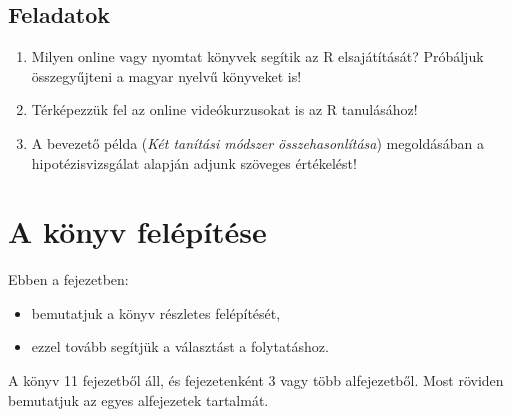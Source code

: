 \documentclass[
]{book}
\makeatletter
\providecommand{\tightlist}{%
  \setlength{\itemsep}{0pt}\setlength{\parskip}{0pt}}
\newenvironment{kframe}{%
\medskip{}
\setlength{\fboxsep}{.8em}
 \def\at@end@of@kframe{}%
 \ifinner\ifhmode%
  \def\at@end@of@kframe{\end{minipage}}%
  \begin{minipage}{\columnwidth}%
 \fi\fi%
 \def\FrameCommand##1{\hskip\@totalleftmargin \hskip-\fboxsep
 \colorbox{shadecolor}{##1}\hskip-\fboxsep
     \hskip-\linewidth \hskip-\@totalleftmargin \hskip\columnwidth}%
 \MakeFramed {\advance\hsize-\width
   \@totalleftmargin\z@ \linewidth\hsize
   \@setminipage}}%
 {\par\unskip\endMakeFramed%
 \at@end@of@kframe}
\newenvironment{rmdblock}[1]
  {
  \begin{itemize}
  \renewcommand{\labelitemi}{
    \raisebox{-.7\height}[0pt][0pt]{
      {\setkeys{Gin}{width=3em,keepaspectratio}\texttt{[image: images/\#1]}}
    }
  }
  \setlength{\fboxsep}{1em}
  \begin{kframe}
  \item
  }
  {
  \end{kframe}
  \end{itemize}
  }
\newenvironment{rmdlevel2}
  {\begin{rmdblock}{level2}}
  {\end{rmdblock}}
\newenvironment{rmdexercise}
  {\begin{rmdblock}{exercise}}
  {\end{rmdblock}}
\makeatother
\begin{document}
\hypertarget{itt-kezdodik-1-exercise}{%
\subsection{Feladatok}\label{itt-kezdodik-1-exercise}}

\begin{rmdexercise}
\begin{enumerate}
\def\labelenumi{\arabic{enumi}.}
\tightlist
\item
  Milyen online vagy nyomtat könyvek segítik az R elsajátítását?
  Próbáljuk összegyűjteni a magyar nyelvű könyveket is!
\item
  Térképezzük fel az online videókurzusokat is az R tanulásához!
\item
  A bevezető példa (\emph{Két tanítási módszer összehasonlítása})
  megoldásában a hipotézisvizsgálat alapján adjunk szöveges értékelést!
\end{enumerate}
\end{rmdexercise}

\hypertarget{a-kuxf6nyv-feluxe9puxedtuxe9se}{%
\section{A könyv felépítése}\label{a-kuxf6nyv-feluxe9puxedtuxe9se}}

\begin{rmdlevel2}
Ebben a fejezetben:

\begin{itemize}
\tightlist
\item
  bemutatjuk a könyv részletes felépítését,
\item
  ezzel tovább segítjük a választást a folytatáshoz.
\end{itemize}
\end{rmdlevel2}

A könyv 11 fejezetből áll, és fejezetenként 3 vagy több alfejezetből. Most röviden bemutatjuk az egyes alfejezetek tartalmát.

\begingroup\fontsize{10}{11}\selectfont
\end{document}
